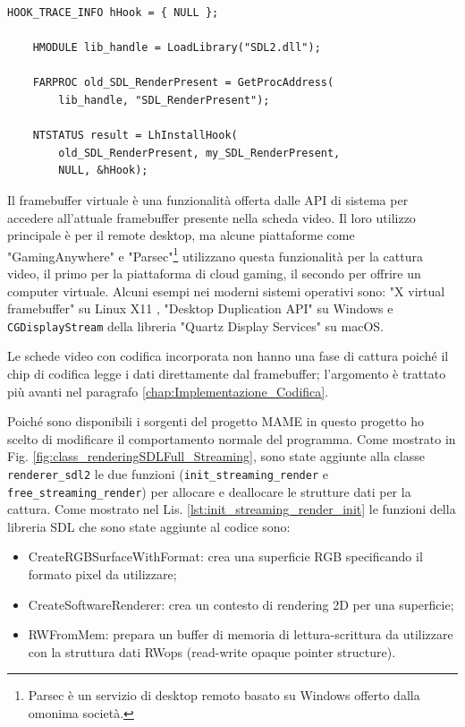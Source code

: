 \begin{lstlisting}[caption=Codice di hook per la libreria SDL, label={lst:hookCode}]
	HOOK_TRACE_INFO hHook = { NULL };
	
	HMODULE lib_handle = LoadLibrary("SDL2.dll");

	FARPROC old_SDL_RenderPresent =	GetProcAddress(
		lib_handle, "SDL_RenderPresent");

	NTSTATUS result = LhInstallHook(
		old_SDL_RenderPresent, my_SDL_RenderPresent,
		NULL, &hHook);
\end{lstlisting}

Il framebuffer virtuale è una funzionalità offerta dalle API di sistema per accedere all'attuale framebuffer presente nella scheda video. Il loro utilizzo principale è per il remote desktop, ma alcune piattaforme come "GamingAnywhere" \parencite{GamingAnywhere} e "Parsec"\footnote{Parsec è un servizio di desktop remoto basato su Windows offerto dalla omonima società.} \parencite{TheTechnologyBehindALowLatencyCloudGamingService} utilizzano questa funzionalità per la cattura video, il primo per la piattaforma di cloud gaming, il secondo per offrire un computer virtuale. Alcuni esempi nei moderni sistemi operativi sono: "X virtual framebuffer" su Linux X11 \parencite{XVFB}, "Desktop Duplication API" su Windows \parencite{DesktopDuplicationAPI} e \verb|CGDisplayStream| della libreria "Quartz Display Services" su macOS.

Le schede video con codifica incorporata non hanno una fase di cattura poiché il chip di codifica legge i dati direttamente dal framebuffer; l'argomento è trattato più avanti nel paragrafo \ref{chap:Implementazione_Codifica}.

Poiché sono disponibili i sorgenti del progetto MAME in questo progetto ho scelto di modificare il comportamento normale del programma. Come mostrato in Fig. \ref{fig:class_renderingSDLFull_Streaming}, sono state aggiunte alla classe \verb|renderer_sdl2| le due funzioni (\verb|init_streaming_render| e \verb|free_streaming_render|) per allocare e deallocare le strutture dati per la cattura. Come mostrato nel Lis. \ref{lst:init_streaming_render_init} le funzioni della libreria SDL che sono state aggiunte al codice sono:

\begin{itemize}
	\item CreateRGBSurfaceWithFormat: crea una superficie RGB specificando il formato pixel da utilizzare;	
	\item CreateSoftwareRenderer: crea un contesto di rendering 2D per una superficie;
	\item RWFromMem: prepara un buffer di memoria di lettura-scrittura da utilizzare con la struttura dati RWops (read-write opaque pointer structure).	
\end{itemize}

